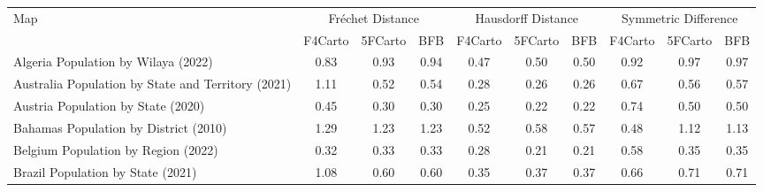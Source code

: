
\begin{tabular}{lccc|ccc|ccc}
\toprule
\multirow{2}{*}{Map} & \multicolumn{3}{c}{Fréchet Distance} & \multicolumn{3}{c}{Hausdorff Distance} & \multicolumn{3}{c}{Symmetric Difference} \\
\cmidrule(lr){2-10}
                   & F4Carto & 5FCarto & BFB & F4Carto & 5FCarto & BFB & F4Carto & 5FCarto & BFB \\
\midrule

                      Algeria Population by Wilaya (2022) &                      0.83 &                      0.93 &                         0.94 &                        0.47 &                        0.50 &                           0.50 &                          0.92 &                          0.97 &                             0.97 \\
       Australia Population by State and Territory (2021) &                      1.11 &                      0.52 &                         0.54 &                        0.28 &                        0.26 &                           0.26 &                          0.67 &                          0.56 &                             0.57 \\
                       Austria Population by State (2020) &                      0.45 &                      0.30 &                         0.30 &                        0.25 &                        0.22 &                           0.22 &                          0.74 &                          0.50 &                             0.50 \\
                    Bahamas Population by District (2010) &                      1.29 &                      1.23 &                         1.23 &                        0.52 &                        0.58 &                           0.57 &                          0.48 &                          1.12 &                             1.13 \\
                      Belgium Population by Region (2022) &                      0.32 &                      0.33 &                         0.33 &                        0.28 &                        0.21 &                           0.21 &                          0.58 &                          0.35 &                             0.35 \\
                        Brazil Population by State (2021) &                      1.08 &                      0.60 &                         0.60 &                        0.35 &                        0.37 &                           0.37 &                          0.66 &                          0.71 &                             0.71 \\

\end{tabular}
